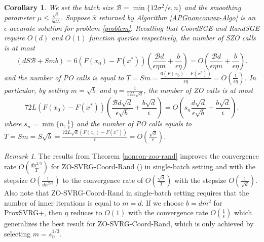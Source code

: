 \documentclass{article}
\newtheorem{corollary}[theorem]{Corollary}
\theoremstyle{definition}
\theoremstyle{remark}
\newtheorem{remark}[theorem]{Remark}
\begin{document}
\begin{corollary}\label{corr11-rand}
We set the batch size $\mathcal{B} = \min\{12\sigma^2/\epsilon, n\}$ and the smoothing parameter $\mu \leq \frac{\sqrt{\epsilon}}{5{dL}}$. Suppose $\hat{x}$ returned by Algorithm \ref{APGnonconvex-Algo}  is an $\epsilon$-accurate solution for problem \eqref{problem}. Recalling that CoordSGE and RandSGE require $O(d)$ and $O(1)$ function queries respectively, the number of SZO calls is at most 
\begin{equation}\label{SZO-call-nocon-rand}
(dS\mathcal{B}+Smb) = 6 \left(F(x_0) - F({x}^*)\right) (\frac{\mathcal{B}d}{\epsilon\eta m}+\frac{b}{\epsilon\eta}) = O\left(\frac{\mathcal{B}d}{\epsilon\eta m}+\frac{b}{\epsilon\eta}\right).
\end{equation} 
and the number of PO calls is equal to $T = Sm = \frac{6\left(F(x_0) - F({x}^*)\right)}{\epsilon\eta} = O\left(\frac{1}{\epsilon\eta}\right)$. In particular, by setting $m=\sqrt{b}$ and $\eta = \frac{1}{12L\sqrt{d}}$, the number of ZO calls is at most 
\begin{equation}\label{SZO-call-par-nocon-rand}
72 L (F(x_0)-F(x^*))\left(\frac{\mathcal{B}d\sqrt{d}}{\epsilon\sqrt{b}}+\frac{b\sqrt{d}}{\epsilon}\right) = O\left(s_n\frac{d\sqrt{d}}{\epsilon \sqrt{b}}+\frac{b\sqrt{d}}{\epsilon}\right).
\end{equation}
where $s_n = \min\{n,\frac{1}{\epsilon}\}$ and the number of PO calls equals to $T = Sm = S\sqrt{b} = \frac{72 L \sqrt{d}\left(F(x_0) - F({x}^*)\right)}{\epsilon} = O\left(\frac{\sqrt{d}}{\epsilon}\right)$. 
\end{corollary}
\begin{remark}
The results from Theorem \ref{noncon-zoo-rand} improves the convergence rate $O(\frac{d{n}^{2/3}}{T})$ for ZO-SVRG-Coord-Rand (\cite{ji2019improved}) in single-batch setting  and   with the stepsize $O(\frac{1}{dn^{2/3}})$ to the convergence rate of $O(\frac{\sqrt{d}}{T})$
with the stepsize $O(\frac{1}{\sqrt{d}})$. Also note that ZO-SVRG-Coord-Rand in single-batch setting requires that the number of inner iterations is equal to $m = d$. If we
choose $b = d m^2$ for ProxSVRG+, then $\eta$ reduces to $O(1)$ with the convergence rate $O(\frac{1}{\epsilon})$ which generalizes the best result for ZO-SVRG-Coord-Rand, which is only achieved by selecting $m = s_n^{1/3}$.
\end{remark}
\end{document}
